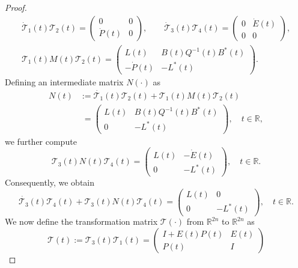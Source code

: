 \documentclass{IEEEtran}
\begin{document}
\begin{proof}
		\begin{gather*}
			\dot{\mathcal T}_1(t) \mathcal T_2(t)= \begin{pmatrix} 0&0\\\dot{P}(t)&0 \end{pmatrix}, \qquad
			\dot{\mathcal T}_3(t)\mathcal T_4(t)= \begin{pmatrix} 0&\dot{E}(t)\\0&0 \end{pmatrix}, \\
			\mathcal T_1(t) M(t)\mathcal T_2(t)=
			\begin{pmatrix}
				L(t)& B(t)Q^{-1}(t)B^*(t)\\
				-\dot P(t)& -L^*(t)
			\end{pmatrix}.
		\end{gather*}
		Defining an intermediate matrix $N(\cdot)$ as
		\begin{equation*}
			\begin{split}
				N(t)&:=
				\dot{\mathcal T_1}(t) \mathcal T_2(t)+\mathcal T_1(t) M(t)\mathcal T_2(t)\\
				&\;=\begin{pmatrix}
					L(t)& B(t)Q^{-1}(t)B^*(t)\\
					0&-L^*(t)
				\end{pmatrix}, \quad t\in \mathbb{R},
			\end{split}
		\end{equation*}
		we further compute
		\begin{equation*}
			\mathcal T_3(t) N(t) \mathcal T_4(t)=\begin{pmatrix}
				L(t)& -\dot E(t) \\
				0&-L^*(t)
			\end{pmatrix}, \quad t\in \mathbb{R}.
		\end{equation*}
		Consequently, we obtain
		\begin{equation*}
			\dot{\mathcal T_3}(t) \mathcal T_4(t)+\mathcal T_3(t) N(t) \mathcal T_4(t) =
			\begin{pmatrix}
				L(t)& 0\\
				0&-L^*(t)
			\end{pmatrix}, \quad t\in \mathbb{R}.
		\end{equation*}
		We now define the transformation matrix $\mathcal T(\cdot)$ from $\mathbb R^{2n}$ to $\mathbb R^{2n}$ as
		\begin{equation}\label{dic}
			\mathcal T(t):=\mathcal T_3(t) \mathcal T_1(t)
			=\begin{pmatrix}
				I+E(t)P(t)&E(t)\\P(t)&I

\end{pmatrix}
\end{equation}
\end{proof}
\end{document}
